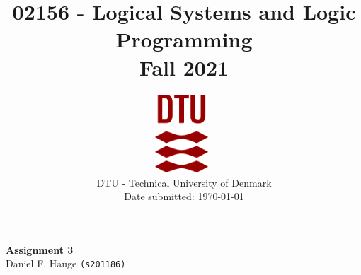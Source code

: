 \documentclass[a4paper]{article}
\begin{document}
\title{02156 - Logical Systems and Logic Programming\\Fall 2021}
\author{
\includegraphics[width=0.15\textwidth]{images/dtu.eps}~\\[1cm]
    DTU - Technical University of Denmark
    \\[0.5cm]
    Date submitted: \today
    \\
}
\date{} %
\color{black}
\maketitle
\begin{center}
{ \huge \bfseries Assignment 3}\\

\vspace{.25cm}
Daniel F. Hauge \texttt{(s201186)}\\


\vspace{.25cm}
\end{center}


\medskip
\newpage


\end{document}

